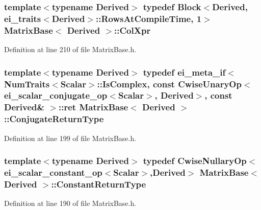 \hypertarget{class_matrix_base_a6363c7feaa2dd9f84d98923d76d4ca8a}{
\subsubsection[{Col\-Xpr}]{\setlength{\rightskip}{0pt plus 5cm}template$<$typename Derived$>$ typedef {\bf Block}$<$Derived, {\bf ei\-\_\-traits}$<$Derived$>$\-::{\bf Rows\-At\-Compile\-Time}, 1$>$ {\bf Matrix\-Base}$<$ Derived $>$\-::{\bf Col\-Xpr}}}\label{class_matrix_base_a6363c7feaa2dd9f84d98923d76d4ca8a}


Definition at line 210 of file Matrix\-Base.\-h.

\hypertarget{class_matrix_base_a91f43c00ced2c79a68df37e6251b0db5}{
\subsubsection[{Conjugate\-Return\-Type}]{\setlength{\rightskip}{0pt plus 5cm}template$<$typename Derived$>$ typedef {\bf ei\-\_\-meta\-\_\-if}$<${\bf Num\-Traits}$<${\bf Scalar}$>$\-::Is\-Complex, const {\bf Cwise\-Unary\-Op}$<${\bf ei\-\_\-scalar\-\_\-conjugate\-\_\-op}$<${\bf Scalar}$>$, Derived$>$, const Derived\& $>$\-::{\bf ret} {\bf Matrix\-Base}$<$ Derived $>$\-::{\bf Conjugate\-Return\-Type}}}\label{class_matrix_base_a91f43c00ced2c79a68df37e6251b0db5}


Definition at line 199 of file Matrix\-Base.\-h.

\hypertarget{class_matrix_base_aa9bcfa09043d1337c3575f008d3e04da}{
\subsubsection[{Constant\-Return\-Type}]{\setlength{\rightskip}{0pt plus 5cm}template$<$typename Derived$>$ typedef {\bf Cwise\-Nullary\-Op}$<${\bf ei\-\_\-scalar\-\_\-constant\-\_\-op}$<${\bf Scalar}$>$,Derived$>$ {\bf Matrix\-Base}$<$ Derived $>$\-::{\bf Constant\-Return\-Type}}}\label{class_matrix_base_aa9bcfa09043d1337c3575f008d3e04da}


Definition at line 190 of file Matrix\-Base.\-h.

